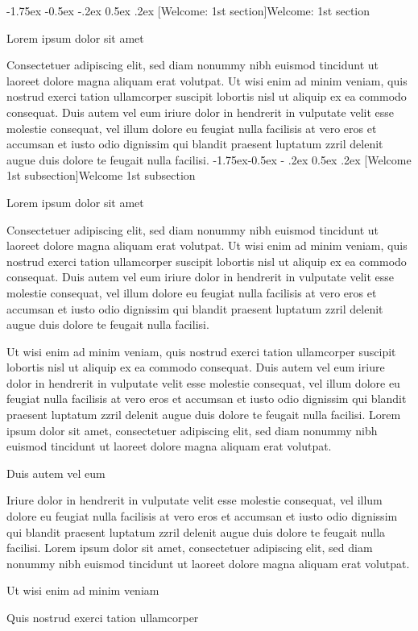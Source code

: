 \documentclass[11pt,twoside]{article}\makeatletter
\makeatletter
\renewcommand\section{\@startsection {section}{1}{\z@}%
     {-1.75ex \@plus -0.5ex \@minus -.2ex}%
     {0.5ex \@plus .2ex}%
     {\reset@font\Large\bfseries\sffamily}}
\renewcommand\subsection{\@startsection{subsection}{2}{\z@}%
     {-1.75ex\@plus -0.5ex \@minus- .2ex}%
     {0.5ex \@plus .2ex}%
     {\reset@font\Large\sffamily}}
\makeatother
\begin{document}
\section[{Welcome: 1st section}]{Welcome: 1st section}\label{part1}\par
Lorem ipsum dolor sit amet\par
Consectetuer adipiscing elit, sed diam nonummy nibh euismod tincidunt ut laoreet dolore magna aliquam erat volutpat. Ut wisi enim ad minim veniam, quis nostrud exerci tation ullamcorper suscipit lobortis nisl ut aliquip ex ea commodo consequat. Duis autem vel eum iriure dolor in hendrerit in vulputate velit esse molestie consequat, vel illum dolore eu feugiat nulla facilisis at vero eros et accumsan et iusto odio dignissim qui blandit praesent luptatum zzril delenit augue duis dolore te feugait nulla facilisi.
\subsection[{Welcome 1st subsection}]{Welcome 1st subsection}\par
Lorem ipsum dolor sit amet\par
Consectetuer adipiscing elit, sed diam nonummy nibh euismod tincidunt ut laoreet dolore magna aliquam erat volutpat. Ut wisi enim ad minim veniam, quis nostrud exerci tation ullamcorper suscipit lobortis nisl ut aliquip ex ea commodo consequat. Duis autem vel eum iriure dolor in hendrerit in vulputate velit esse molestie consequat, vel illum dolore eu feugiat nulla facilisis at vero eros et accumsan et iusto odio dignissim qui blandit praesent luptatum zzril delenit augue duis dolore te feugait nulla facilisi.\par
Ut wisi enim ad minim veniam, quis nostrud exerci tation ullamcorper suscipit lobortis nisl ut aliquip ex ea commodo consequat. Duis autem vel eum iriure dolor in hendrerit in vulputate velit esse molestie consequat, vel illum dolore eu feugiat nulla facilisis at vero eros et accumsan et iusto odio dignissim qui blandit praesent luptatum zzril delenit augue duis dolore te feugait nulla facilisi. Lorem ipsum dolor sit amet, consectetuer adipiscing elit, sed diam nonummy nibh euismod tincidunt ut laoreet dolore magna aliquam erat volutpat. \par
Duis autem vel eum \par
Iriure dolor in hendrerit in vulputate velit esse molestie consequat, vel illum dolore eu feugiat nulla facilisis at vero eros et accumsan et iusto odio dignissim qui blandit praesent luptatum zzril delenit augue duis dolore te feugait nulla facilisi. Lorem ipsum dolor sit amet, consectetuer adipiscing elit, sed diam nonummy nibh euismod tincidunt ut laoreet dolore magna aliquam erat volutpat. \par
Ut wisi enim ad minim veniam\par
Quis nostrud exerci tation ullamcorper 
\end{document}
